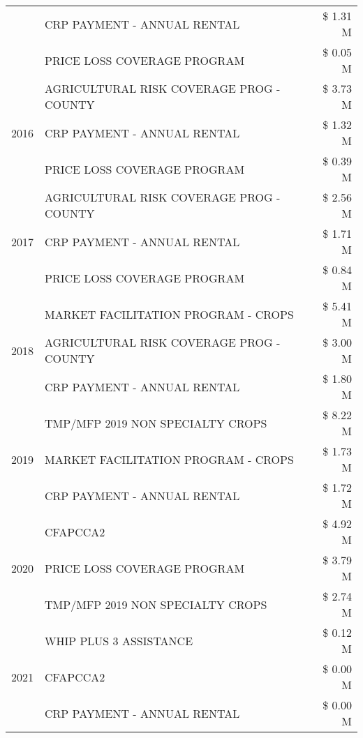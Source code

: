 \begin{tabular}{llr}
 & CRP PAYMENT - ANNUAL RENTAL & \$ 1.31 M \\
 & PRICE LOSS COVERAGE PROGRAM & \$ 0.05 M \\
\cline{1-3}
\multirow[t]{3}{*}{2016} & AGRICULTURAL RISK COVERAGE PROG - COUNTY & \$ 3.73 M \\
 & CRP PAYMENT - ANNUAL RENTAL & \$ 1.32 M \\
 & PRICE LOSS COVERAGE PROGRAM & \$ 0.39 M \\
\cline{1-3}
\multirow[t]{3}{*}{2017} & AGRICULTURAL RISK COVERAGE PROG - COUNTY & \$ 2.56 M \\
 & CRP PAYMENT - ANNUAL RENTAL & \$ 1.71 M \\
 & PRICE LOSS COVERAGE PROGRAM & \$ 0.84 M \\
\cline{1-3}
\multirow[t]{3}{*}{2018} & MARKET FACILITATION PROGRAM - CROPS & \$ 5.41 M \\
 & AGRICULTURAL RISK COVERAGE PROG - COUNTY & \$ 3.00 M \\
 & CRP PAYMENT - ANNUAL RENTAL & \$ 1.80 M \\
\cline{1-3}
\multirow[t]{3}{*}{2019} & TMP/MFP 2019 NON SPECIALTY CROPS & \$ 8.22 M \\
 & MARKET FACILITATION PROGRAM - CROPS & \$ 1.73 M \\
 & CRP PAYMENT - ANNUAL RENTAL & \$ 1.72 M \\
\cline{1-3}
\multirow[t]{3}{*}{2020} & CFAPCCA2 & \$ 4.92 M \\
 & PRICE LOSS COVERAGE PROGRAM & \$ 3.79 M \\
 & TMP/MFP 2019 NON SPECIALTY CROPS & \$ 2.74 M \\
\cline{1-3}
\multirow[t]{3}{*}{2021} & WHIP PLUS 3 ASSISTANCE & \$ 0.12 M \\
 & CFAPCCA2 & \$ 0.00 M \\
 & CRP PAYMENT - ANNUAL RENTAL & \$ 0.00 M \\
\cline{1-3}
\bottomrule
\end{tabular}
